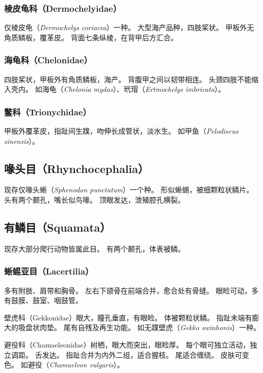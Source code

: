 \documentclass[11pt]{article}
\begin{document}
\subsubsection{棱皮龟科（Dermochelyidae）}
仅棱皮龟（\textit{Dermochelys coriacea}）一种。
大型海产品种，四肢桨状。
甲板外无角质鳞板，覆革皮。
背面七条纵棱，在背甲后方汇合。

\subsubsection{海龟科（Chelonidae）}
四肢桨状，甲板外有角质鳞板，海产。
背腹甲之间以韧带相连。
头颈四肢不能缩入壳内。
如海龟（\textit{Chelonia mydas}）、玳瑁（\textit{Ertmochelys imbricata}）。

\subsubsection{鳖科（Trionychidae）}
甲板外覆革皮，指趾间生蹼，吻伸长成管状，淡水生。
如甲鱼（\textit{Pelodiscus sinensis}）。

\subsection{喙头目（Rhynchocephalia）}
现存仅喙头蜥（\textit{Sphenodon punctatum}）一个种。
形似蜥蜴，被细颗粒状鳞片。
头有两个颞孔，嘴长似鸟喙。
顶眼发达，泄殖腔孔横裂。

\subsection{有鳞目（Squamata）}
现存大部分爬行动物皆属此目。
有两个颞孔，体表被鳞。

\subsubsection{蜥蜴亚目（Lacertilia）}
多有附肢、肩带和胸骨。
左右下颌骨在前端合并，愈合处有骨缝。
眼睑可动，多有鼓膜、鼓室、咽鼓管。

\newline
壁虎科（Gekkonidae）眼大，瞳孔垂直，有眼睑。
体被颗粒状鳞。
指趾末端有膨大的吸盘状肉垫。
尾有自残及再生功能。
如无蹼壁虎（\textit{Gekko swinhonis}）一种。

\newline

避役科（Chamaeleonidae）树栖，眼大而突出，眼睑厚。
每个眼可独立活动，独立调距。
舌发达。
指趾合并为内外二组，适合握枝。
尾适合缠绕。
皮肤可变色。
如避役（\textit{Chamaeleon vulgaris}）。
\end{document}

